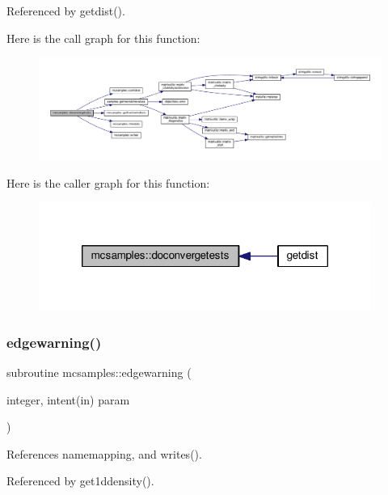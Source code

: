 Referenced by getdist().

Here is the call graph for this function\+:
\nopagebreak
\begin{figure}[H]
\begin{center}
\leavevmode
\includegraphics[width=350pt]{namespacemcsamples_a4a0eac91a04d742f776ae4f8f15d919c_cgraph}
\end{center}
\end{figure}
Here is the caller graph for this function\+:
\nopagebreak
\begin{figure}[H]
\begin{center}
\leavevmode
\includegraphics[width=308pt]{namespacemcsamples_a4a0eac91a04d742f776ae4f8f15d919c_icgraph}
\end{center}
\end{figure}
\mbox{\label{namespacemcsamples_a083f4a491dcb1c55ed0f61c0e4f435b1}} 
\subsubsection{\texorpdfstring{edgewarning()}{edgewarning()}}
{\footnotesize\ttfamily subroutine mcsamples\+::edgewarning (\begin{DoxyParamCaption}\item[{integer, intent(in)}]{param }\end{DoxyParamCaption})}



References namemapping, and writes().



Referenced by get1ddensity().

